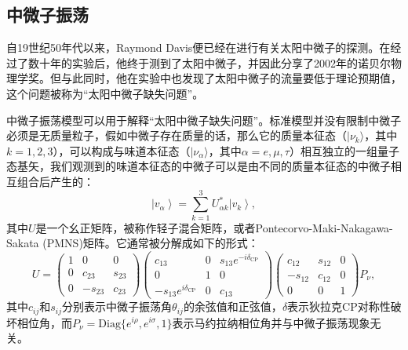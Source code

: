 \subsection{中微子振荡}

自19世纪50年代以来，Raymond Davis便已经在进行有关太阳中微子的探测\cite{Davis:1955}。在经过了数十年的实验后，他终于测到了太阳中微子，并因此分享了2002年的诺贝尔物理学奖。但与此同时，他在实验中也发现了太阳中微子的流量要低于理论预期值\cite{Cleveland:1998}，这个问题被称为“太阳中微子缺失问题”。

中微子振荡模型可以用于解释“太阳中微子缺失问题”\cite{Bahcall:2001}。标准模型并没有限制中微子必须是无质量粒子，假如中微子存在质量的话，那么它的质量本征态（$|\nu_k\rangle$，其中$k=1,2,3$），可以构成与味道本征态（$ |\nu_\alpha\rangle$，其中$\alpha = e, \mu, \tau$）相互独立的一组量子态基矢，我们观测到的味道本征态的中微子可以是由不同的质量本征态的中微子相互组合后产生的：
\begin{equation}
    \left|v_{\alpha}\right\rangle = \sum_{k=1}^{3} U_{\alpha k}^{*}\left|v_{k}\right\rangle , 
    \label{eq: neutrino oscillation}
\end{equation}
其中$U$是一个幺正矩阵，被称作轻子混合矩阵，或者Pontecorvo-Maki-Nakagawa-Sakata (PMNS)矩阵\cite{Pontecorvo:1957, Maki:1962, Pontecorvo:1967}。它通常被分解成如下的形式：
\begin{equation}
    U=\left(\begin{array}{ccc}{1} & {0} & {0} \\ {0} & {c_{23}} & {s_{23}} \\ {0} & {-s_{23}} & {c_{23}}\end{array}\right)\left(\begin{array}{ccc}{c_{13}} & {0} & {s_{13} e^{-i \delta_{\mathrm{CP}}}} \\ {0} & {1} & {0} \\ {-s_{13} e^{i \delta_{\mathrm{CP}}}} & {0} & {c_{13}}\end{array}\right)\left(\begin{array}{ccc}{c_{12}} & {s_{12}} & {0} \\ {-s_{12}} & {c_{12}} & {0} \\ {0} & {0} & {1}\end{array}\right) P_\nu , 
    \label{eq: PMNS matrix}
\end{equation}
其中$c_{ij}$和$s_{ij}$分别表示中微子振荡角$\theta_{ij}$的余弦值和正弦值，$\delta$表示狄拉克CP对称性破坏相位角，而$P_\nu = \mathrm{Diag} \{e^{i\rho},  e^{i\sigma}, 1 \}$表示马约拉纳相位角并与中微子振荡现象无关。

